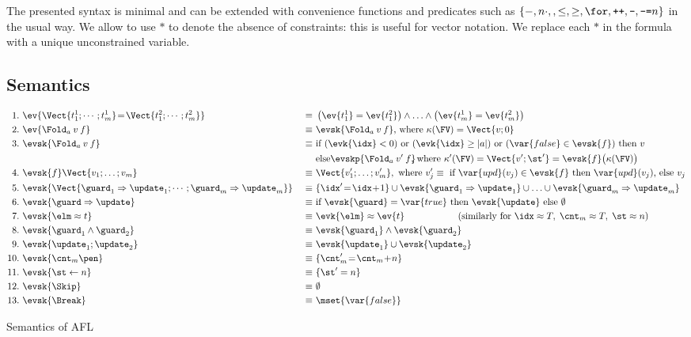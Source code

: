 The presented syntax is minimal and can be extended with convenience functions and predicates such as $\{-, n \cdot, , \le, \ge, \for, \texttt{++},\texttt{--},\texttt{-=}n \}$ in the usual way. We allow to use $*$ to denote the absence of constraints: this is useful for vector notation. We replace each $*$ in the formula with a unique unconstrained variable.




\subsection{Semantics}


\begin{table}[t]
\begin{align*}
   1.~& \ev{\Vect{t^1_1;\cdots;t^1_m}\! =\! \Vect{t^2_1;\cdots;t^2_m}}\!\!\!\!\!\!\!\!\!\!\! &~\equiv~  &\left(\ev{t^1_1} = \ev{t^2_1} \right) \land \ldots \land \left(\ev{t^1_m} = \ev{t^2_m} \right) \\
2.~& \ev{\Fold_{a}\: v\: f} &~\equiv~  &\evsk{\Fold_{a}\: v\: f} \text{, where } \kappa(\FV) = \Vect{v;0}\\   
3.~&\evsk{\Fold_{a}\: v\: f} &~\equiv~ &\text{if  } (\evk{\idx}<0) \text{ or } (\evk{\idx}\ge |a|) \text{ or } (\var{false} \in \evsk{f}) \text{ then } v\\  
& & &\text{else} \evskp{\Fold_{a}\: v'\: f}\!\!\!\text{, where } \kappa'(\FV) = \Vect{v';\st'} = \evsk{f}\big(\kappa(\FV)\big)\\  
4.~&\evsk{f}\Vect{v_1;\ldots;v_m} &~\equiv~  & \Vect{v'_1;\ldots;v'_m}, \text{ where } v'_j \equiv \text{ if } \var{upd}(v_j) \in \evsk{f} \text{ then } \var{upd}(v_j) \text{, else } v_j \\
5.~&\evsk{\Vect{\guard_1 \Rightarrow \update_1;\cdots;\guard_m \Rightarrow \update_m}} &~\equiv~  & \{\idx'\!=\!\idx\!+\!1\} \cup \evsk{\guard_1 \Rightarrow \update_1} \cup \ldots \cup  \evsk{\guard_m \Rightarrow \update_m}\\  
6.~&\evsk{\guard \Rightarrow \update} &~\equiv~ &\text{if } \evsk{\guard}=\var{true} \text{  then  } \evsk{\update} \text{  else  } \emptyset\\
7.~&\evsk{ \elm \approx t} &~\equiv~  &\evk{\elm} \approx \ev{t} \hspace{20mm}\text{(similarly for } \idx \approx T ,\; \cnt_m \approx T,\;    \st \approx  n \text{)}\\  
8.~&\evsk{\guard_1 \land \guard_2} &~\equiv~  &\evsk{\guard_1} \land \evsk{\guard_2} \\  
9.~&\evsk{\update_1 ; \update_2} &~\equiv~  &\evsk{\update_1} \cup \evsk{\update_2} \\  
10.~&\evsk{\cnt_m \pen } &~\equiv~ & \{\cnt_m' \!=\! \cnt_m \!+\! n \}\\
11.~&\evsk{\st \leftarrow n } &~\equiv~  & \{\st' = n \}\\  
12.~&\evsk{\Skip} &~\equiv~ & \emptyset\\
13.~&\evsk{\Break} &~\equiv~ & \mset{\var{false}} 
\end{align*}
\vspace*{2mm}
\caption{Semantics of AFL}
\label{tab:semantics}
\end{table}



